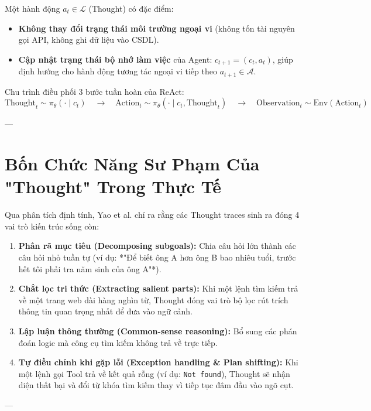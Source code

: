\documentclass[11pt,a4paper]{article}
\begin{document}
Một hành động $a_t \in \mathcal{L}$ (Thought) có đặc điểm:
\begin{itemize}[leftmargin=1.5em]
    \item \textbf{Không thay đổi trạng thái môi trường ngoại vi} (không tốn tài nguyên gọi API, không ghi dữ liệu vào CSDL).
    \item \textbf{Cập nhật trạng thái bộ nhớ làm việc} của Agent: $c_{t+1} = (c_t, a_t)$, giúp định hướng cho hành động tương tác ngoại vi tiếp theo $a_{t+1} \in \mathcal{A}$.
\end{itemize}

Chu trình điều phối 3 bước tuần hoàn của ReAct:
\begin{equation}
    \text{Thought}_t \sim \pi_\theta(\cdot \mid c_t) \quad \longrightarrow \quad \text{Action}_t \sim \pi_\theta(\cdot \mid c_t, \text{Thought}_t) \quad \longrightarrow \quad \text{Observation}_t \sim \text{Env}(\text{Action}_t)
\end{equation}

---

\section{Bốn Chức Năng Sư Phạm Của "Thought" Trong Thực Tế}

Qua phân tích định tính, Yao et al. chỉ ra rằng các Thought traces sinh ra đóng 4 vai trò kiến trúc sống còn:
\begin{enumerate}[leftmargin=1.8em]
    \item \textbf{Phân rã mục tiêu (Decomposing subgoals):} Chia câu hỏi lớn thành các câu hỏi nhỏ tuần tự (ví dụ: *"Để biết ông A hơn ông B bao nhiêu tuổi, trước hết tôi phải tra năm sinh của ông A"*).
    \item \textbf{Chắt lọc tri thức (Extracting salient parts):} Khi một lệnh tìm kiếm trả về một trang web dài hàng nghìn từ, Thought đóng vai trò bộ lọc rút trích thông tin quan trọng nhất để đưa vào ngữ cảnh.
    \item \textbf{Lập luận thông thường (Common-sense reasoning):} Bổ sung các phán đoán logic mà công cụ tìm kiếm không trả về trực tiếp.
    \item \textbf{Tự điều chỉnh khi gặp lỗi (Exception handling \& Plan shifting):} Khi một lệnh gọi Tool trả về kết quả rỗng (ví dụ: \texttt{Not found}), Thought sẽ nhận diện thất bại và đổi từ khóa tìm kiếm thay vì tiếp tục đâm đầu vào ngõ cụt.
\end{enumerate}

---
\end{document}
